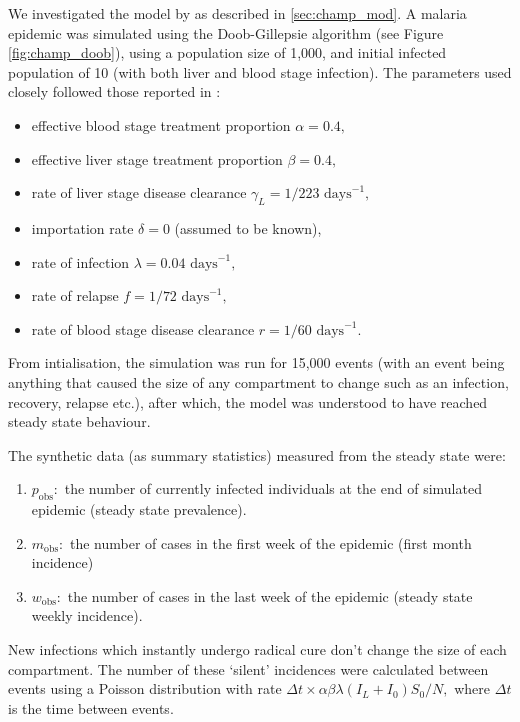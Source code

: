 We investigated the model by \cite{champagne_using_2022} as described in
\ref{sec:champ_mod}. A malaria epidemic was simulated using the Doob-Gillepsie
algorithm (see Figure \ref{fig:champ_doob}), using a population
size of 1,000, and initial infected population of 10 (with both liver and blood
stage infection). The parameters used closely followed those reported in
\cite{champagne_using_2022}: \begin{itemize}
    \item effective blood stage treatment proportion $\alpha = 0.4,$
    \item effective liver stage treatment proportion $\beta = 0.4,$
    \item rate of liver stage disease clearance
          $\gamma_L = 1 / 223 \text{ days}^{-1},$
    \item importation rate $\delta = 0$ (assumed to be known),
    \item rate of infection $\lambda = 0.04 \text{ days}^{-1},$
    \item rate of relapse $f = 1 / 72 \text{ days}^{-1},$
    \item rate of blood stage disease clearance $r = 1 / 60 \text{ days}^{-1}.$
\end{itemize}

From intialisation, the simulation was run for 15,000 events
(with an event being anything that caused the size of any compartment to change
such as an infection, recovery, relapse etc.), after which, the model was
understood to have reached steady state behaviour.

The synthetic data (as summary statistics) measured from the steady state
were:
\begin{enumerate}
    \item $p_\text{obs}:$ the number of currently infected individuals at the
          end of simulated epidemic (steady state prevalence).
    \item $m_\text{obs}:$ the number of cases in the first week of the epidemic
          (first month incidence)
    \item $w_\text{obs}:$ the number of cases in the last week of the epidemic
          (steady state weekly incidence).
\end{enumerate}

New infections which instantly undergo radical cure don't change the size of
each compartment. The number of these `silent' incidences were calculated
between events using a Poisson distribution with rate
$\Delta t \times \alpha \beta \lambda (I_L + I_0) S_0 / N,$ where $\Delta t$ is
the time between events.

